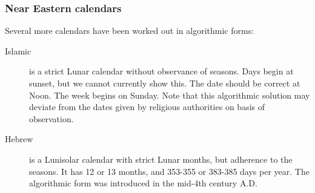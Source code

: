 \subsubsection{Near Eastern calendars}
Several more calendars have been worked out in algorithmic forms:
\begin{description}
\item[Islamic] is a strict Lunar calendar without observance of
  seasons. Days begin at sunset, but we cannot currently show
  this. The date should be correct at Noon. The week begins on
  Sunday. Note that this algorithmic solution may deviate from the
  dates given by religious authorities on basis of observation.
\item[Hebrew] is a Lunisolar calendar with strict Lunar months, but
  adherence to the seasons. It has 12 or 13 months, and 353-355 or
  383-385 days per year. The algorithmic form was introduced in the
  mid-4th century A.D.
\end{description}


